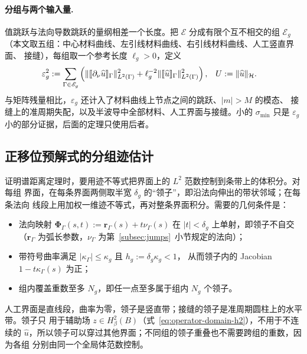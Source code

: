 \paragraph{分组与两个输入量.}
值跳跃与法向导数跳跃的量纲相差一个长度。把 $\mathscr E$ 分成有限个互不相交的组
$\mathscr E_g$（本文取五组：中心材料曲线、左引线材料曲线、右引线材料曲线、人工竖直界面、
接缝），每组取一个参考长度 $\ell_g>0$，定义
\begin{align}
  \varepsilon_g^2
  &:=\sum_{\Gamma\in\mathscr E_g}
  \left(
    \lVert\llbracket \partial_\nu\widehat u\rrbracket_\Gamma\rVert_{L^2(\Gamma)}^2
    +\ell_g^{-2}\lVert\llbracket \widehat u\rrbracket_\Gamma\rVert_{L^2(\Gamma)}^2
  \right),
  &U&:=\lVert\widehat u\rVert_{\mathcal H}.
  \label{eq:boundary-defect-norm}
\end{align}
与矩阵残量相比，$\varepsilon_g$ 还计入了材料曲线上节点之间的跳跃、$|m|>M$ 的模态、
接缝上的准周期失配，以及半波导中全部材料、人工界面与接缝。小的 $\sigma_{\min}$ 只是
$\varepsilon_g$ 小的部分证据，后面的定理只使用后者。


\subsection{正移位预解式的分组迹估计}
\label{subsec:trace}

证明谱距离定理时，要用迹不等式把界面上的 $L^2$ 范数控制到条带上的体积分。对每组
界面，在每条界面两侧取半宽 $\delta_g$ 的“领子”，即沿法向伸出的带状邻域；在每条法向
线段上用加权一维迹不等式，再对整条界面积分。需要的几何条件是：
\begin{itemize}
  \item 法向映射 $\boldsymbol\Phi_\Gamma(s,t):=\boldsymbol r_\Gamma(s)+t\nu_\Gamma(s)$
    在 $|t|<\delta_g$ 上单射，即领子不自交（$\boldsymbol r_\Gamma$ 为弧长参数，$\nu_\Gamma$
    为第~\ref{subsec:jumps}~小节规定的法向）；
  \item 带符号曲率满足 $\lvert\kappa_\Gamma\rvert\leq\kappa_g$ 且 $h_g:=\delta_g\kappa_g<1$，
    从而领子内的 Jacobian $1-t\kappa_\Gamma(s)$ 为正；
  \item 组内覆盖重数至多 $N_g$，即任一点至多属于组内 $N_g$ 个领子。
\end{itemize}
人工界面是直线段，曲率为零，领子是竖直带；接缝的领子是准周期圆柱上的水平带。领子只
用于辅助场 $z\in H^2_\beta(B)$（式~\eqref{eq:operator-domain-h2}），不用于不连续的
$\widehat u$，所以领子可以穿过其他界面；不同组的领子重叠也不需要跨组的重数，因为各组
分别由同一个全局体范数控制。


